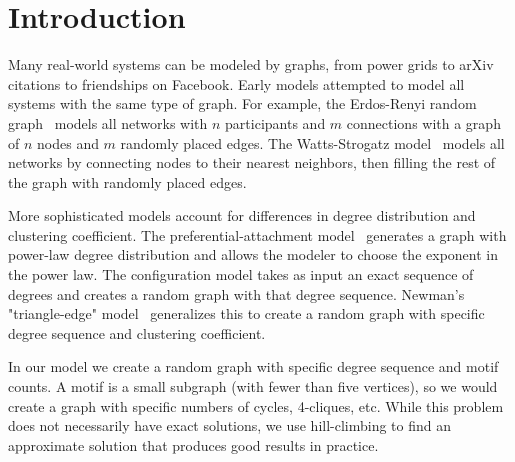 \section{Introduction}
\label{sec:intro}

Many real-world systems can be modeled by graphs, from power grids to arXiv citations to friendships on Facebook.  Early models attempted to model all systems with the same type of graph.  For example, the Erdos-Renyi random graph~\cite{erdds1959random}\cite{erdos1960random} models all networks with $n$ participants and $m$ connections with a graph of $n$ nodes and $m$ randomly placed edges.  The Watts-Strogatz model~\cite{watts1998collective} models all networks by connecting nodes to their nearest neighbors, then filling the rest of the graph with randomly placed edges.

More sophisticated models account for differences in degree distribution and clustering coefficient.  The preferential-attachment model~\cite{albert2002statistical} generates a graph with power-law degree distribution and allows the modeler to choose the exponent in the power law.  The configuration model takes as input an exact sequence of degrees and creates a random graph with that degree sequence.  Newman's "triangle-edge" model~\cite{newman2009random} generalizes this to create a random graph with specific degree sequence and clustering coefficient.

In our model we create a random graph with specific degree sequence and motif counts.  A motif is a small subgraph (with fewer than five vertices), so we would create a graph with specific numbers of cycles, 4-cliques, etc.  While this problem does not necessarily have exact solutions, we use hill-climbing to find an approximate solution that produces good results in practice.
